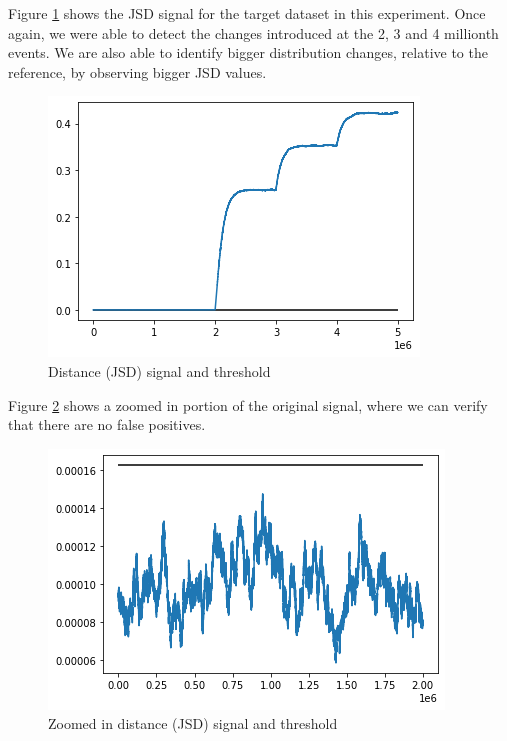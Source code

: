 Figure \ref{fig:JSD-signal-test03} shows the JSD signal for the target dataset in this experiment. Once again, we were able to detect the changes introduced at the 2, 3 and 4 millionth events. We are also able to identify bigger distribution changes, relative to the reference, by observing bigger JSD values.
\begin{figure}[!htb]
    \begin{center}
      \includegraphics[scale=0.6]{figures/stream-analysis-viz-test03.png}
      \caption[]{Distance (JSD) signal and threshold}
      \label{fig:JSD-signal-test03}
    \end{center}
\end{figure}
Figure \ref{fig:JSD-signal-zoom-test03} shows a zoomed in portion of the original signal, where we can verify that there are no false positives.
\begin{figure}[!htb]
    \begin{center}
      \includegraphics[scale=0.6]{figures/stream-analysis-viz-zoom-test03.png}
      \caption[]{Zoomed in distance (JSD) signal and threshold}
      \label{fig:JSD-signal-zoom-test03}
    \end{center}
\end{figure}


